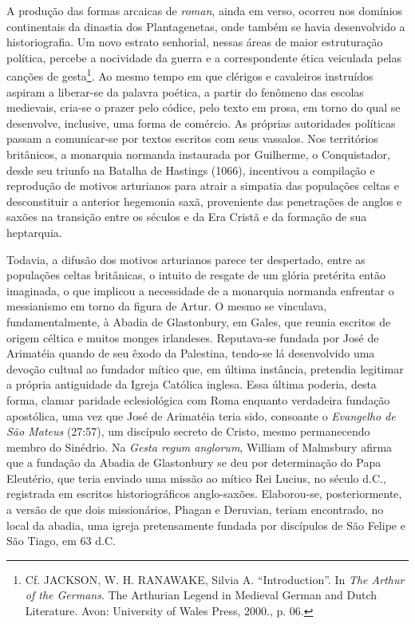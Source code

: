 A produção das formas arcaicas de \textit{roman}, ainda em verso, ocorreu nos
domínios continentais da dinastia dos Plantagenetas, onde também se havia
desenvolvido a historiografia. Um novo estrato senhorial, nessas áreas de maior
estruturação política, percebe a nocividade da guerra e a correspondente ética
veiculada pelas canções de gesta\footnote{ Cf. JACKSON, W. H. RANAWAKE, Silvia
A. “Introduction”. In \textit{The Arthur of the Germans}. The Arthurian Legend
in Medieval German and Dutch Literature. Avon: University of Wales Press,
2000., p. 06. }. Ao mesmo tempo em que clérigos e cavaleiros instruídos aspiram
a liberar-se da palavra poética, a partir do fenômeno das escolas medievais,
cria-se o prazer pelo códice, pelo texto em prosa, em torno do qual se
desenvolve, inclusive, uma forma de comércio. As próprias autoridades políticas
passam a comunicar-se por textos escritos com seus vassalos. Nos territórios
britânicos, a monarquia normanda instaurada por Guilherme, o Conquistador,
desde seu triunfo na Batalha de Hastings (1066), incentivou a compilação e
reprodução de motivos arturianos para atrair a simpatia das populações celtas e
desconstituir a anterior hegemonia saxã, proveniente das penetrações de anglos
e saxões na transição entre os séculos  e  da Era Cristã e da formação de
sua heptarquia. 

Todavia, a difusão dos motivos arturianos parece ter despertado, entre as
populações celtas britânicas, o intuito de resgate de um glória pretérita então
imaginada, o que implicou a necessidade de a monarquia normanda enfrentar o
messianismo em torno da figura de Artur. O mesmo se vinculava,
fundamentalmente, à Abadia de Glastonbury, em Gales, que reunia escritos de
origem céltica e muitos monges irlandeses. Reputava-se fundada por José de
Arimatéia quando de seu êxodo da Palestina, tendo-se lá desenvolvido uma
devoção cultual ao fundador mítico que, em última instância, pretendia
legitimar a própria antiguidade da Igreja Católica inglesa. Essa última
poderia, desta forma, clamar paridade eclesiológica com Roma enquanto
verdadeira fundação apostólica, uma vez que José de Arimatéia teria sido,
consoante o \textit{Evangelho de São Mateus} (27:57), um discípulo secreto de
Cristo, mesmo permanecendo membro do Sinédrio. Na \textit{Gesta regum
anglorum}, William of Malmsbury afirma que a fundação da Abadia de Glastonbury
se deu por determinação do Papa Eleutério, que teria enviado uma missão ao
mítico Rei Lucius, no século  d.C., registrada em escritos historiográficos
anglo-saxões. Elaborou-se, posteriormente, a versão de que dois missionários,
Phagan e Deruvian, teriam encontrado, no local da abadia, uma igreja
pretensamente fundada por discípulos de São Felipe e São Tiago, em 63 d.C.

